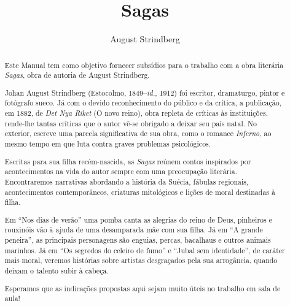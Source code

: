 \documentclass[12pt]{extarticle}
\begin{document}
\baselineskip\par


\newcommand{\AutorLivro}{August Strindberg}
\newcommand{\TituloLivro}{Sagas}
\newcommand{\Tema}{Ficção, mistério e fantasia}
\newcommand{\Genero}{Conto, crônica e novela}
\newcommand{\imagemCapa}{./images/PNLD0040-01.png}
\newcommand{\issnppub}{---}
\newcommand{\issnepub}{---}
\newcommand{\colaborador}{\textbf{Bruno Gradella e Vicente Castro} é uma pessoa incrível e vai fazer um bom serviço.}


\title{\TituloLivro}
\author{\AutorLivro}
\def\authornotes{\colaborador}

\date{}
\maketitle

\begin{abstract}
Este Manual tem como objetivo fornecer subsídios para o trabalho com a
obra literária \emph{Sagas}, obra de autoria de August Strindberg.

Johan August Strindberg (Estocolmo, 1849--\textit{id.}, 1912) 
foi escritor, dramaturgo, pintor e fotógrafo sueco. Já com o devido
reconhecimento do público e da crítica, a publicação, em 1882, de 
\textit{Det Nya Riket} (O novo reino), obra repleta de críticas às 
instituições, rende-lhe tantas críticas que o autor vê-se obrigado
a deixar seu país natal. No exterior, escreve uma parcela significativa 
de sua obra, como o romance \textit{Inferno}, ao mesmo tempo em que 
luta contra graves problemas psicológicos.

Escritas para sua filha recém-nascida, as \textit{Sagas} reúnem contos
inspirados por acontecimentos na vida do autor sempre com uma preocupação 
literária. Encontraremos narrativas abordando a história da Suécia, fábulas 
regionais, acontecimentos contemporâneos, criaturas mitológicos e lições de 
moral destinadas à filha. 

Em ``Nos dias de verão'' uma pomba canta as alegrias do reino de Deus, 
pinheiros e rouxinóis vão à ajuda de uma desamparada mãe com sua filha. 
Já em ``A grande peneira'', as principais personagens são enguias, percas, 
bacalhaus e outros animais marinhos. Já em ``Os segredos do celeiro de fumo''
e ``Jubal sem identidade'', de caráter mais moral, veremos histórias sobre 
artistas desgraçados pela sua arrogância, quando deixam o talento subir à cabeça.

Esperamos que as indicações propostas aqui sejam muito úteis no trabalho em
sala de aula! 


\end{abstract}
\end{document}
